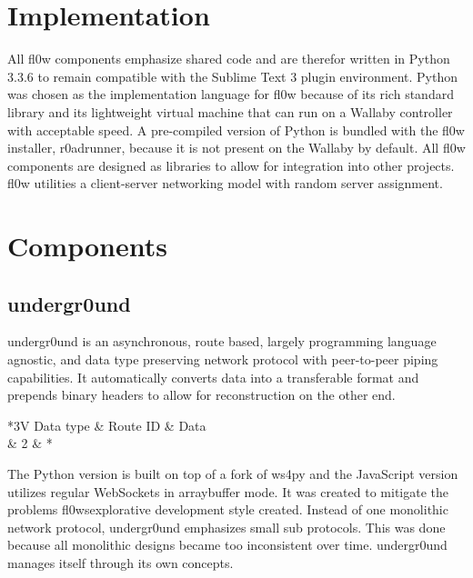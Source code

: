 \documentclass[conference]{IEEEtran}
\begin{document}
\section{Implementation}
All fl0w\cite{fl0w:Philip Trauner} components emphasize shared code and are therefor written in Python\cite{Python:Python Foundation} 3.3.6 to remain compatible with the Sublime Text 3\cite{Sublime Text 3:Sublime HQ} plugin environment. Python\cite{Python:Python Foundation} was chosen as the implementation language for fl0w\cite{fl0w:Philip Trauner} because of its rich standard library and its lightweight virtual machine that can run on a Wallaby\cite{Wallaby Controller:KIPR} controller with acceptable speed. A pre-compiled version of Python\cite{Python:Python Foundation} is bundled with the fl0w\cite{fl0w:Philip Trauner} installer, r0adrunner, because it is not present on the Wallaby\cite{Wallaby Controller:KIPR} by default. All fl0w\cite{fl0w:Philip Trauner} components are designed as libraries to allow for integration into other projects. fl0w\cite{fl0w:Philip Trauner} utilities a client-server networking model with random server assignment.

\section{Components}

\subsection{undergr0und}
undergr0und\cite{undergr0und:Philip Trauner} is an asynchronous, route based, largely programming language agnostic, and data type preserving network protocol with peer-to-peer piping capabilities.
It automatically converts data into a transferable format and prepends binary headers to allow for reconstruction on the other end.

\begin{table}[H]
\caption{The binary encoding of undergr0und (in bytes)}
\centering
	\begin{tabular}{*{3}{V}}
		Data type & Route ID & Data \\  & 2 & * \\
	\end{tabular}
\label{fig:undergr0und_header}
\end{table}


The Python\cite{Python:Python Foundation} version is built on top of a fork of ws4py\cite{ws4py:Philip Trauner} and the JavaScript version utilizes regular WebSockets\cite{The WebSocket Protocol:A. Melnikov} in arraybuffer mode. It was created to mitigate the problems fl0ws\cite{fl0w:Philip Trauner}explorative development style created. Instead of one monolithic network protocol, undergr0und emphasizes small sub protocols. This was done because all monolithic designs became too inconsistent over time. undergr0und\cite{undergr0und:Philip Trauner} manages itself through its own concepts.\\
\end{document}

